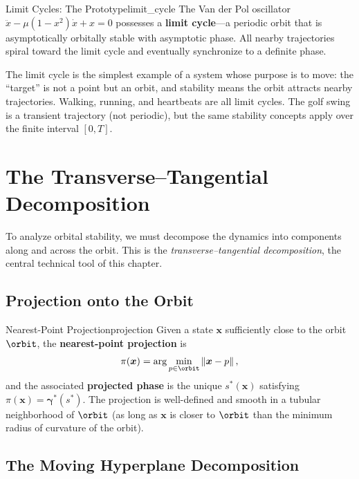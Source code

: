 \documentclass[12pt, openany]{book}
\theoremstyle{plain}
\newcommand{\state}{\bm{x}}
\newcommand{\traj}{\bm{\gamma}}
\newcommand{\norm}[1]{\left\lVert #1 \right\rVert}
\begin{document}
\begin{example}{Limit Cycles: The Prototype}{limit_cycle}
  The Van der Pol oscillator $\ddot{x} - \mu(1 - x^2)\dot{x} + x = 0$
  possesses a \textbf{limit cycle}---a periodic orbit that is asymptotically
  orbitally stable with asymptotic phase. All nearby trajectories spiral
  toward the limit cycle and eventually synchronize to a definite phase.

  The limit cycle is the simplest example of a system whose purpose is to
  move: the ``target'' is not a point but an orbit, and stability means
  the orbit attracts nearby trajectories. Walking, running, and heartbeats
  are all limit cycles. The golf swing is a transient trajectory (not
  periodic), but the same stability concepts apply over the finite interval
  $[0, T]$.
\end{example}

\section{The Transverse--Tangential Decomposition}

To analyze orbital stability, we must decompose the dynamics into components
along and across the orbit. This is the \emph{transverse--tangential
decomposition}, the central technical tool of this chapter.

\subsection{Projection onto the Orbit}

\begin{definition}{Nearest-Point Projection}{projection}
  Given a state $\state$ sufficiently close to the orbit $\orbit$, the
  \textbf{nearest-point projection} is
  \begin{equation}\label{eq:projection}
    \pi(\state) = \arg\min_{p \in \orbit} \norm{\state - p},
  \end{equation}
  and the associated \textbf{projected phase} is the unique $s^*(\state)$
  satisfying $\pi(\state) = \traj^*(s^*)$. The projection is well-defined
  and smooth in a tubular neighborhood of $\orbit$ (as long as $\state$
  is closer to $\orbit$ than the minimum radius of curvature of the orbit).
\end{definition}

\subsection{The Moving Hyperplane Decomposition}
\end{document}
